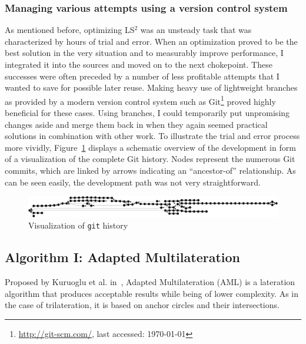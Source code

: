 \subsubsection{Managing various attempts using a version control system}
As mentioned before, optimizing LS$^{2}$ was an unsteady task that was characterized by hours of trial and error. When an optimization proved to be the best solution in the very situation and to measurably improve performance, I integrated it into the sources and moved on to the next chokepoint. These successes were often preceded by a number of less profitable attempts that I wanted to save for possible later reuse. Making heavy use of lightweight branches as provided by a modern version control system such as Git\footnote{\url{http://git-scm.com/}, last accessed: \today{}} proved highly beneficial for these cases. Using branches, I could temporarily put unpromising changes aside and merge them back in when they again seemed practical solutions in combination with other work. To illustrate the trial and error process more vividly, Figure~\ref{fig:branchtree} displays a schematic overview of the development in form of a visualization of the complete Git history. Nodes represent the numerous Git commits, which are linked by arrows indicating an ``ancestor-of'' relationship. As can be seen easily, the development path was not very straightforward.

\begin{figure}[h]
\begin{center}
\includegraphics[width=14cm]{img/branchtree}
\end{center}
\caption{Visualization of \texttt{git} history}
\label{fig:branchtree}
\end{figure}

\subsection{Algorithm I: Adapted Multilateration}
Proposed by Kuruoglu et al. in~\cite{kuruoglu2009aml}, Adapted Multilateration (AML) is a lateration algorithm that produces acceptable results while being of lower complexity. As in the case of trilateration, it is based on anchor circles and their intersections.

